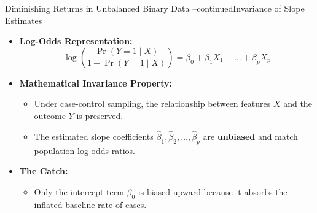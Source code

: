 \documentclass[aspectratio=169, 11pt]{beamer}
\begin{document}
\begin{frame}{Diminishing Returns in Unbalanced Binary Data --continued}{Invariance of Slope Estimates}
    \begin{itemize}
        \item \textbf{Log-Odds Representation:}
        \[
            \log\left(\frac{\Pr(Y=1 \mid X)}{1 - \Pr(Y=1 \mid X)}\right) = \beta_0 + \beta_1 X_1 + \dots + \beta_p X_p
        \]
        \item \textbf{Mathematical Invariance Property:}
        \begin{itemize}
            \item Under case-control sampling, the relationship between features $X$ and the outcome $Y$ is preserved.
            \item The estimated slope coefficients $\hat{\beta}_1, \hat{\beta}_2, \dots, \hat{\beta}_p$ are \textbf{unbiased} and match population log-odds ratios.
        \end{itemize}
        \vspace{0.5em}
        \item \textbf{The Catch:}
        \begin{itemize}
            \item Only the intercept term $\beta_0$ is biased upward because it absorbs the inflated baseline rate of cases.
        \end{itemize}
    \end{itemize}
\end{frame}
\end{document}
